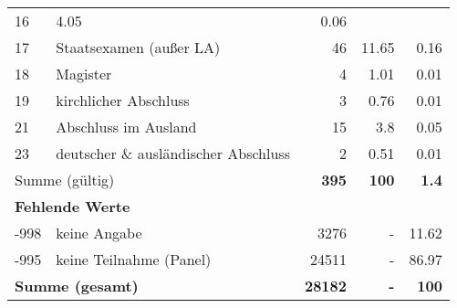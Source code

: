\begin{longtable}{lXrrr}
       \num{16} &
       \num[round-mode=places,round-precision=2]{4,05} &
         \num[round-mode=places,round-precision=2]{0,06} \\

     17 &
     \multicolumn{1}{X}{ Staatsexamen (außer LA)   } &


       \num{46} &
       \num[round-mode=places,round-precision=2]{11,65} &
         \num[round-mode=places,round-precision=2]{0,16} \\

     18 &
     \multicolumn{1}{X}{ Magister   } &


       \num{4} &
       \num[round-mode=places,round-precision=2]{1,01} &
         \num[round-mode=places,round-precision=2]{0,01} \\

     19 &
     \multicolumn{1}{X}{ kirchlicher Abschluss   } &


       \num{3} &
       \num[round-mode=places,round-precision=2]{0,76} &
         \num[round-mode=places,round-precision=2]{0,01} \\

     21 &
     \multicolumn{1}{X}{ Abschluss im Ausland   } &


       \num{15} &
       \num[round-mode=places,round-precision=2]{3,8} &
         \num[round-mode=places,round-precision=2]{0,05} \\

     23 &
     \multicolumn{1}{X}{ deutscher \& ausländischer Abschluss   } &


       \num{2} &
       \num[round-mode=places,round-precision=2]{0,51} &
         \num[round-mode=places,round-precision=2]{0,01} \\
     \midrule
     \multicolumn{2}{l}{Summe (gültig)} &
       \textbf{\num{395}} &
     \textbf{100} &
       \textbf{\num[round-mode=places,round-precision=2]{1,4}} \\
     \multicolumn{5}{l}{\textbf{Fehlende Werte}}\\
       -998 &
       keine Angabe &
         \num{3276} &
        - &
         \num[round-mode=places,round-precision=2]{11,62} \\
       -995 &
       keine Teilnahme (Panel) &
         \num{24511} &
        - &
         \num[round-mode=places,round-precision=2]{86,97} \\
     \midrule
     \multicolumn{2}{l}{\textbf{Summe (gesamt)}} &
          \textbf{\num{28182}} &
        \textbf{-} &
        \textbf{100} \\
     \bottomrule
     \end{longtable}
     
